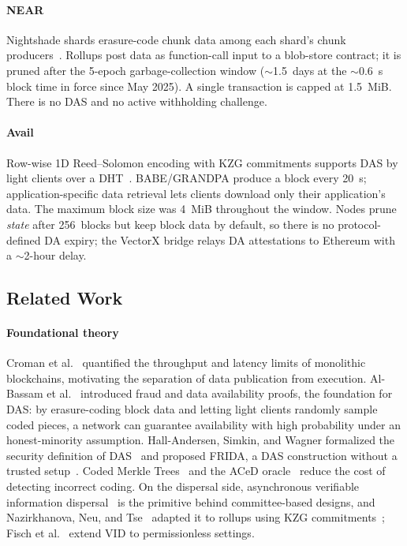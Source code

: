 \paragraph{NEAR}
Nightshade shards erasure-code chunk data among each shard's chunk producers~\cite{NEAR_Nightshade_Scaling_Blockchain}.
Rollups post data as function-call input to a blob-store contract; it is pruned after the 5-epoch garbage-collection window ($\sim$1.5~days at the $\sim$0.6~s block time in force since May 2025). A single transaction is capped at 1.5~MiB. There is no DAS and no active withholding challenge.

\paragraph{Avail}
Row-wise 1D Reed--Solomon encoding with KZG commitments supports DAS by light clients over a DHT~\cite{Avail_The_DA_Blockchain}.
BABE/GRANDPA produce a block every 20~s; application-specific data retrieval lets clients download only their application's data.
The maximum block size was 4~MiB throughout the window. Nodes prune \emph{state} after 256~blocks but keep block data by default, so there is no protocol-defined DA expiry; the VectorX bridge relays DA attestations to Ethereum with a $\sim$2-hour delay.


\subsection{Related Work}
\label{subsec:related-work}

\paragraph{Foundational theory}
Croman et al.~\cite{Croman2016Scaling} quantified the throughput and latency limits of monolithic blockchains, motivating the separation of data publication from execution.
Al-Bassam et al.~\cite{AlBassam_FraudDA} introduced fraud and data availability proofs, the foundation for DAS: by erasure-coding block data and letting light clients randomly sample coded pieces, a network can guarantee availability with high probability under an honest-minority assumption.
Hall-Andersen, Simkin, and Wagner formalized the security definition of DAS~\cite{HallAndersen2025FoundationsDAS} and proposed FRIDA, a DAS construction without a trusted setup~\cite{HallAndersen2024FRIDA}.
Coded Merkle Trees~\cite{Yu2020CodedMerkle} and the ACeD oracle~\cite{Sheng2021ACeD} reduce the cost of detecting incorrect coding.
On the dispersal side, asynchronous verifiable information dispersal~\cite{Cachin2005AVID} is the primitive behind committee-based designs, and Nazirkhanova, Neu, and Tse~\cite{Nazirkhanova2022VID} adapted it to rollups using KZG commitments~\cite{KZG_Original}; Fisch et al.~\cite{Fisch2025PermissionlessVID} extend VID to permissionless settings.

